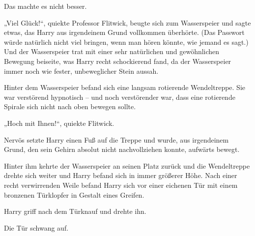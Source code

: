 Das machte es nicht besser.

„Viel Glück!“, quiekte Professor Flitwick, beugte sich zum Wasserspeier und sagte etwas, das Harry aus irgendeinem Grund vollkommen überhörte. (Das Passwort würde natürlich nicht viel bringen, wenn man hören könnte, wie jemand es sagt.) Und der Wasserspeier trat mit einer sehr natürlichen und gewöhnlichen Bewegung beiseite, was Harry recht schockierend fand, da der Wasserspeier immer noch wie fester, unbeweglicher Stein aussah.

Hinter dem Wasserspeier befand sich eine langsam rotierende Wendeltreppe. Sie war verstörend hypnotisch – und noch verstörender war, dass eine rotierende Spirale sich nicht nach oben bewegen sollte.

„Hoch mit Ihnen!“, quiekte Flitwick.

Nervös setzte Harry einen Fuß auf die Treppe und wurde, aus irgendeinem Grund, den sein Gehirn absolut nicht nachvollziehen konnte, aufwärts bewegt.

Hinter ihm kehrte der Wasserspeier an seinen Platz zurück und die Wendeltreppe drehte sich weiter und Harry befand sich in immer größerer Höhe. Nach einer recht verwirrenden Weile befand Harry sich vor einer eichenen Tür mit einem bronzenen Türklopfer in Gestalt eines Greifen.

Harry griff nach dem Türknauf und drehte ihn.

Die Tür schwang auf.

